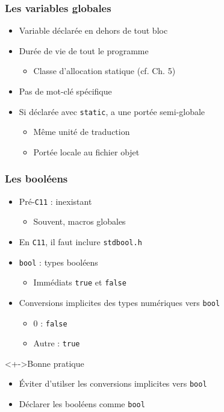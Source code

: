 \begin{frame}
\frametitle{Les variables globales}
\begin{itemize}[<+->]
\item Variable déclarée en dehors de tout bloc
\item Durée de vie de tout le programme
	\begin{itemize}
	\item Classe d'allocation statique (cf. Ch. 5)
	\end{itemize}
\item Pas de mot-clé spécifique
\item Si déclarée avec \lstinline|static|, a une portée semi-globale
	\begin{itemize}
	\item Même unité de traduction
	\item Portée locale au fichier objet
	\end{itemize}
\end{itemize}
\end{frame}

\begin{frame}
\frametitle{Les booléens}
\begin{itemize}[<+->]
\item Pré-\texttt{C11} : inexistant
	\begin{itemize}	
	\item Souvent, macros globales
	\end{itemize}
\item En \texttt{C11}, il faut inclure \texttt{stdbool.h}
\item \lstinline|bool| : types booléens
	\begin{itemize}
	\item Immédiats \lstinline|true| et \lstinline|false|	
	\end{itemize}
\item Conversions implicites des types numériques vers \lstinline|bool|
	\begin{itemize}
	\item $0$ : \lstinline|false|
	\item Autre : \lstinline|true|
	\end{itemize}
\end{itemize}
\begin{exampleblock}<+->{Bonne pratique}
	\begin{itemize}[<+->]
	\item Éviter d'utilser les conversions implicites vers \lstinline|bool|
	\item Déclarer les booléens comme \lstinline|bool|
	\end{itemize}
\end{exampleblock}
\end{frame}

